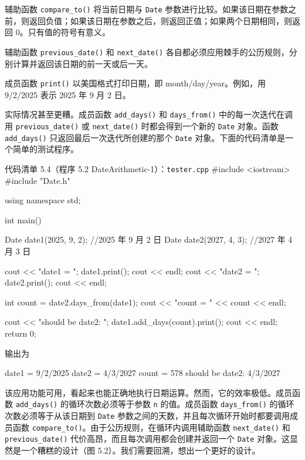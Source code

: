 辅助函数 \texttt{compare\_\allowbreak{}to(\allowbreak{})\allowbreak{}} 将当前日期与 \texttt{Date} 参数进行比较。如果该日期在参数之前，则返回负值；如果该日期在参数之后，则返回正值；如果两个日期相同，则返回 0。只有值的符号有意义。

辅助函数 \texttt{previous\_\allowbreak{}date(\allowbreak{})\allowbreak{}} 和 \texttt{next\_\allowbreak{}date(\allowbreak{})\allowbreak{}} 各自都必须应用棘手的公历规则，分别计算并返回该日期的前一天或后一天。

成员函数 \texttt{print()} 以美国格式打印日期，即 month/day/year。例如，用 9/2/2025 表示 2025 年 9 月 2 日。


实际情况甚至更糟。成员函数 \texttt{add\_\allowbreak{}days(\allowbreak{})\allowbreak{}} 和 \texttt{days\_\allowbreak{}from(\allowbreak{})\allowbreak{}} 中的每一次迭代在调用 \texttt{previous\_\allowbreak{}date(\allowbreak{})\allowbreak{}} 或 \texttt{next\_\allowbreak{}date(\allowbreak{})\allowbreak{}} 时都会得到一个新的 \texttt{Date} 对象。函数 \texttt{add\_\allowbreak{}days(\allowbreak{})\allowbreak{}} 只返回最后一次迭代所创建的那个 \texttt{Date} 对象。下面的代码清单是一个简单的测试程序。

\begin{codeboxt}{代码清单 5.4（程序 5.2 DateArithmetic-1）：\texttt{tester.\allowbreak{}cpp}}
#include <iostream>
#include "Date.h"

using namespace std;

int main()
{
    Date date1(2025, 9, 2);  //2025 年 9 月 2 日
    Date date2(2027, 4, 3);  //2027 年 4 月 3 日

    cout << "date1 = "; date1.print(); cout << endl;
    cout << "date2 = "; date2.print(); cout << endl;

    int count = date2.days_from(date1);
    cout << "count = " << count << endl;

    cout << "should be date2: ";
    date1.add_days(count).print(); cout << endl;
    return 0;
}
\end{codeboxt}

输出为

\begin{codebox}
date1 = 9/2/2025
date2 = 4/3/2027
count = 578
should be date2: 4/3/2027
\end{codebox}

该应用功能可用，看起来也能正确地执行日期运算。然而，它的效率极低。成员函数 \texttt{add\_\allowbreak{}days(\allowbreak{})\allowbreak{}} 的循环次数必须等于参数 \texttt{n} 的值。成员函数 \texttt{days\_\allowbreak{}from(\allowbreak{})\allowbreak{}} 的循环次数必须等于从该日期到 \texttt{Date} 参数之间的天数，并且每次循环开始时都要调用成员函数 \texttt{compare\_\allowbreak{}to(\allowbreak{})\allowbreak{}}。由于公历规则，在循环内调用辅助函数 \texttt{next\_\allowbreak{}date(\allowbreak{})\allowbreak{}} 和 \texttt{previous\_\allowbreak{}date(\allowbreak{})\allowbreak{}} 代价高昂，而且每次调用都会创建并返回一个 \texttt{Date} 对象。这显然是一个糟糕的设计（图 5.2）。我们需要回溯，想出一个更好的设计。

